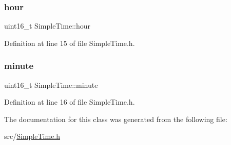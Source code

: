 \subsubsection{\texorpdfstring{hour}{hour}}
{\footnotesize\ttfamily uint16\+\_\+t Simple\+Time\+::hour\hspace{0.3cm}{\ttfamily [private]}}



Definition at line 15 of file Simple\+Time.\+h.

\mbox{\label{class_simple_time_ad8cfa601eddca64717e27a8ec95cddfa}} 
\subsubsection{\texorpdfstring{minute}{minute}}
{\footnotesize\ttfamily uint16\+\_\+t Simple\+Time\+::minute\hspace{0.3cm}{\ttfamily [private]}}



Definition at line 16 of file Simple\+Time.\+h.



The documentation for this class was generated from the following file\+:\begin{DoxyCompactItemize}
\item 
src/\mbox{\hyperlink{_simple_time_8h}{Simple\+Time.\+h}}\end{DoxyCompactItemize}
